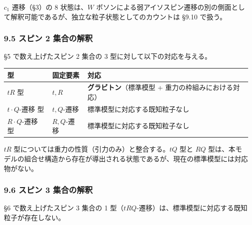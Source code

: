 \documentclass[
  a4paper,11pt]{ltjsarticle}
\newcounter{none}
\theoremstyle{definition}
\theoremstyle{remark}
\begin{document}
\(c_1\) 遷移（§3）の 8 状態は、\(W\)
ボソンによる弱アイソスピン遷移の別の側面として解釈可能であるが、独立な粒子状態としてのカウントは
§9.10 で扱う。

\subsubsection{9.5 スピン 2
集合の解釈}\label{ux30b9ux30d4ux30f3-2-ux96c6ux5408ux306eux89e3ux91c8}

§5 で数え上げたスピン 2 集合の 3 型に対して以下の対応を与える。

{\def\LTcaptype{none} %
\begin{longtable}[]{@{}
  >{\raggedright\arraybackslash}p{}
  >{\raggedright\arraybackslash}p{}
  >{\raggedright\arraybackslash}p{}@{}}
\toprule\noalign{}
\begin{minipage}[b]{\linewidth}\raggedright
型
\end{minipage} & \begin{minipage}[b]{\linewidth}\raggedright
固定要素
\end{minipage} & \begin{minipage}[b]{\linewidth}\raggedright
対応
\end{minipage} \\
\midrule\noalign{}
\endhead
\bottomrule\noalign{}
\endlastfoot
\(tR\) 型 & \(t, R\) & \textbf{グラビトン}（標準模型 +
重力の枠組みにおける対応） \\
\(t \cdot Q\)-遷移 型 & \(t, Q\)-遷移 &
標準模型に対応する既知粒子なし \\
\(R \cdot Q\)-遷移 型 & \(R, Q\)-遷移 &
標準模型に対応する既知粒子なし \\
\end{longtable}
}

\(tR\) 型については重力の性質（引力のみ）と整合する。\(tQ\) 型と \(RQ\)
型は、本モデルの組合せ構造から存在が導出される状態であるが、現在の標準模型には対応物がない。

\subsubsection{9.6 スピン 3
集合の解釈}\label{ux30b9ux30d4ux30f3-3-ux96c6ux5408ux306eux89e3ux91c8}

§6 で数え上げたスピン 3 集合の 1
型（\(tRQ\)-遷移）は、標準模型に対応する既知粒子が存在しない。
\end{document}
